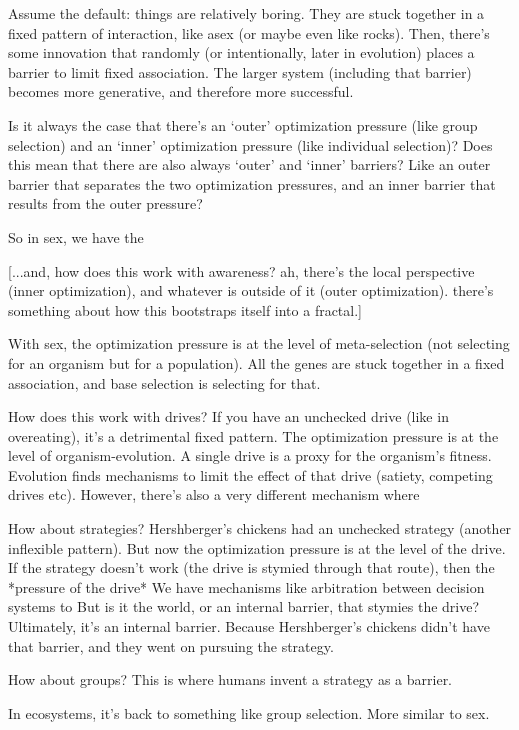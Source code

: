 \documentclass[11pt]{article}
\begin{document}
Assume the default: things are relatively boring. They are stuck together in a fixed pattern of interaction, like asex (or maybe even like rocks). Then, there's some innovation that randomly (or intentionally, later in evolution) places a barrier to limit fixed association. The larger system (including that barrier) becomes more generative, and therefore more successful. 

Is it always the case that there's an `outer' optimization pressure (like group selection) and an `inner' optimization pressure (like individual selection)? Does this mean that there are also always `outer' and `inner' barriers? Like an outer barrier that separates the two optimization pressures, and an inner barrier that results from the outer pressure? 

So in sex, we have the 

[...and, how does this work with awareness? ah, there's the local perspective (inner optimization), and whatever is outside of it (outer optimization). there's something about how this bootstraps itself into a fractal.]

With sex, the optimization pressure is at the level of meta-selection (not selecting for an organism but for a population). All the genes are stuck together in a fixed association, and base selection is selecting for that. 

How does this work with drives? If you have an unchecked drive (like in overeating), it's a detrimental fixed pattern. The optimization pressure is at the level of organism-evolution. A single drive is a proxy for the organism's fitness. Evolution finds mechanisms to limit the effect of that drive (satiety, competing drives etc). However, there's also a very different mechanism where 

How about strategies? Hershberger's chickens had an unchecked strategy (another inflexible pattern). But now the optimization pressure is at the level of the drive. If the strategy doesn't work (the drive is stymied through that route), then the *pressure of the drive*  We have mechanisms like arbitration between decision systems to 
But is it the world, or an internal barrier, that stymies the drive? Ultimately, it's an internal barrier. Because Hershberger's chickens didn't have that barrier, and they went on pursuing the strategy. 

How about groups? This is where humans invent a strategy as a barrier. 

In ecosystems, it's back to something like group selection. More similar to sex. 
\end{document}
